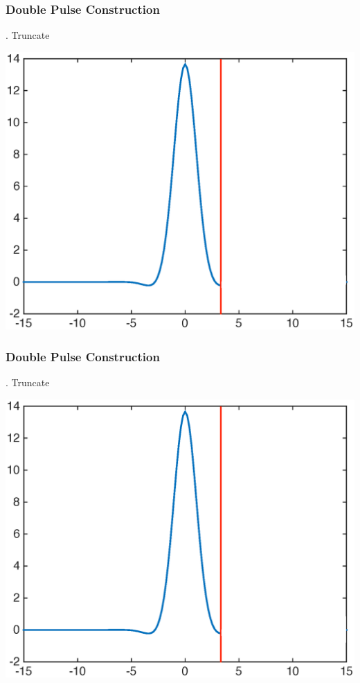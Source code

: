 \documentclass[16pt]{beamer}
\begin{document}
\begin{frame}
	\frametitle{Double Pulse Construction}
	\fontsize{16}{7.2}. Truncate
	\begin{center}
	\includegraphics[width=0.8\linewidth]{images/single}
	\end{center}
\end{frame}

\begin{frame}
	\frametitle{Double Pulse Construction}
	\fontsize{16}{7.2}. Truncate
	\begin{center}
	\includegraphics[width=0.8\linewidth]{images/singlecut}
	\end{center}
\end{frame}
\end{document}
